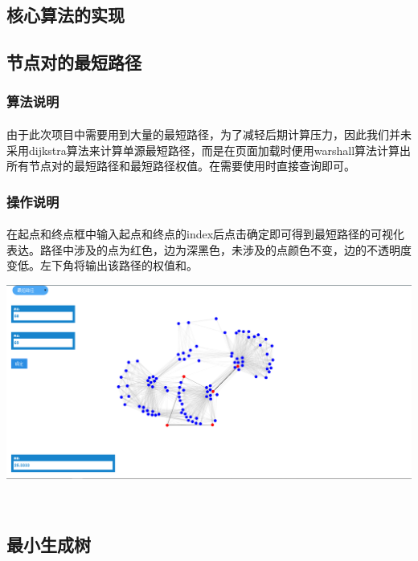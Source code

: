 \documentclass{article}
\begin{document}
\begin{CJK}{UTF8}{gkai}
\section{核心算法的实现} %
	\subsection{节点对的最短路径}
		\subsubsection{算法说明} %
			\paragraph{}
			由于此次项目中需要用到大量的最短路径，为了减轻后期计算压力，因此我们并未采用dijkstra算法来计算单源最短路径，而是在页面加载时便用warshall算法计算出所有节点对的最短路径和最短路径权值。在需要使用时直接查询即可。
		\subsubsection{操作说明}
			\paragraph{}
			在起点和终点框中输入起点和终点的index后点击确定即可得到最短路径的可视化表达。路径中涉及的点为红色，边为深黑色，未涉及的点颜色不变，边的不透明度变低。左下角将输出该路径的权值和。
		\\[\intextsep] 
		\begin{minipage}{\textwidth} 
		    \centering 
		    \includegraphics[width=0.9\linewidth]{path.PNG}
		\end{minipage} 
		\\[\intextsep] 

	\subsection{最小生成树}

\end{CJK}
\end{document}
